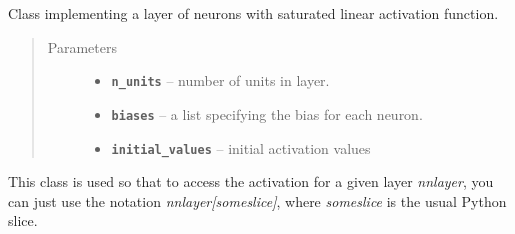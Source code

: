 \documentclass[letterpaper,10pt,english]{sphinxmanual}
\begin{document}
\begin{fulllineitems}
\label{simpleNNlib_docs:simpleNNlib.RampLayer}
Class implementing a layer of neurons with saturated linear activation function.
\begin{quote}\begin{description}
\item[{Parameters}] \leavevmode\begin{itemize}
\item {} 
\textbf{\texttt{n\_units}} -- number of units in layer.

\item {} 
\textbf{\texttt{biases}} -- a list specifying the bias for each neuron.

\item {} 
\textbf{\texttt{initial\_values}} -- initial activation values

\end{itemize}

\end{description}\end{quote}

\end{fulllineitems}


\begin{fulllineitems}
\label{simpleNNlib_docs:simpleNNlib.LayerSlice}
This class is used so that to access the activation for a given layer \emph{nnlayer},
you can just use the notation \emph{nnlayer{[}someslice{]}}, where \emph{someslice} is the usual Python slice.

\end{fulllineitems}

\end{document}
